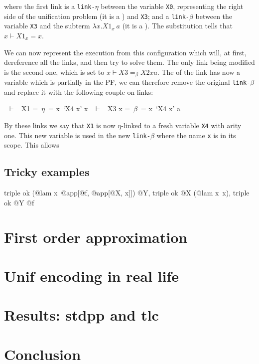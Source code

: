 \documentclass[sigconf,natbib=false,review]{acmart}
\newcommand{\linkbeta}{\texttt{link-}\ensuremath{\beta}\xspace}
\newcommand{\linketa}{\texttt{link-}\ensuremath{\eta}\xspace}
\newcommand{\linkbetaM}[3]{\ensuremath{#1 \vdash #2 =_\beta #3}}
\newcommand{\substCell}[3]{\ensuremath{#1 \vdash #2 = #3}}
\begin{document}
\noindent
where the first link is a \linketa between the variable \texttt{X0}, representing
the right side of the unification problem (it is a \maybeeta) and
\texttt{X3}; and a \linkbeta between the variable \texttt{X3} and the subterm
$\lambda x.X1_x ~ a$ (it is a \maybebeta).
The substitution tells that \substCell{x}{X1_x}{x}.

We can now represent the \hrun execution from this configuration which will, at
first, dereference all the links, and then try to solve them. The only link
being modified is the second one, which is set to \linkbetaM{x}{X3}{X2 x a}. The
\rhs of the link has now a variable which is partially in the PF, we can
therefore remove the original \linkbeta and replace it with the following couple
on links:

\begin{textcode}
  ~$\vdash$~ X1   =~$\eta$~= x\ `X4 x'
x ~$\vdash$~ X3 x =~$\beta$~= x\ `X4 x' a
\end{textcode}

By these links we say that \texttt{X1} is now $\eta$-linked to a fresh variable
\texttt{X4} with arity one. This new variable is used in the new \linkbeta where
the name \texttt{x} is in its scope. This allows

\subsection{Tricky examples}

\begin{elpicode}
  triple ok (@lam x\ @app[@f, @app[@X, x]]) @Y,
  triple ok @X (@lam x\ x),
  triple ok @Y @f
\end{elpicode}

\begin{elpicode}
\end{elpicode}

\section{First order approximation}



\section{Unif encoding in real life}

\section{Results: stdpp and tlc}

\section{Conclusion}

\printbibliography

\clearpage


\end{document}
